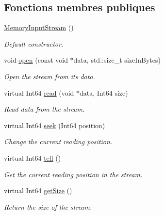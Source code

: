 \subsection*{Fonctions membres publiques}
\begin{DoxyCompactItemize}
\item 
\mbox{\label{classsf_1_1MemoryInputStream_a2d78851a69a8956a79872be41bcdfe0e}} 
\hyperlink{classsf_1_1MemoryInputStream_a2d78851a69a8956a79872be41bcdfe0e}{Memory\+Input\+Stream} ()
\begin{DoxyCompactList}\small\item\em Default constructor. \end{DoxyCompactList}\item 
void \hyperlink{classsf_1_1MemoryInputStream_ad3cfb4f4f915f7803d6a0784e394ac19}{open} (const void $\ast$data, std\+::size\+\_\+t size\+In\+Bytes)
\begin{DoxyCompactList}\small\item\em Open the stream from its data. \end{DoxyCompactList}\item 
virtual Int64 \hyperlink{classsf_1_1MemoryInputStream_adff5270c521819639154d42d76fd4c34}{read} (void $\ast$data, Int64 size)
\begin{DoxyCompactList}\small\item\em Read data from the stream. \end{DoxyCompactList}\item 
virtual Int64 \hyperlink{classsf_1_1MemoryInputStream_aa2ac8fda2bdb4c95248ae90c71633034}{seek} (Int64 position)
\begin{DoxyCompactList}\small\item\em Change the current reading position. \end{DoxyCompactList}\item 
virtual Int64 \hyperlink{classsf_1_1MemoryInputStream_a7ad4bdf721f29de8f66421ff29e23ee4}{tell} ()
\begin{DoxyCompactList}\small\item\em Get the current reading position in the stream. \end{DoxyCompactList}\item 
virtual Int64 \hyperlink{classsf_1_1MemoryInputStream_a6ade3ca45de361ffa0a718595f0b6763}{get\+Size} ()
\begin{DoxyCompactList}\small\item\em Return the size of the stream. \end{DoxyCompactList}\end{DoxyCompactItemize}


